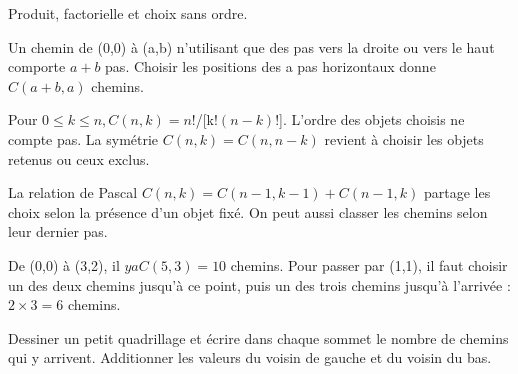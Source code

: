 \documentclass[11pt]{article}
\begin{document}
Produit, factorielle et choix sans ordre.\par
{}
Un chemin de (0,0) à (a,b) n’utilisant que des pas vers la droite ou vers le haut comporte \(a + b\) pas. Choisir les positions des a pas horizontaux donne \(C(a+b,a)\) chemins.\par
Pour \(0 \leq  k \leq  n, C(n,k) = n\)!/[k!\((n-k)\)!]. L’ordre des objets choisis ne compte pas. La symétrie \(C(n,k) = C(n,n-k)\) revient à choisir les objets retenus ou ceux exclus.\par
La relation de Pascal \(C(n,k) = C(n-1,k-1) + C(n-1,k)\) partage les choix selon la présence d’un objet fixé. On peut aussi classer les chemins selon leur dernier pas.\par
{}
De (0,0) à (3,2), il \(y a C(5,3) = 10\) chemins. Pour passer par (1,1), il faut choisir un des deux chemins jusqu’à ce point, puis un des trois chemins jusqu’à l’arrivée : \(2 \times  3 = 6\) chemins.\par
\begin{center}\end{center}
Dessiner un petit quadrillage et écrire dans chaque sommet le nombre de chemins qui y arrivent. Additionner les valeurs du voisin de gauche et du voisin du bas.\par
\end{document}
